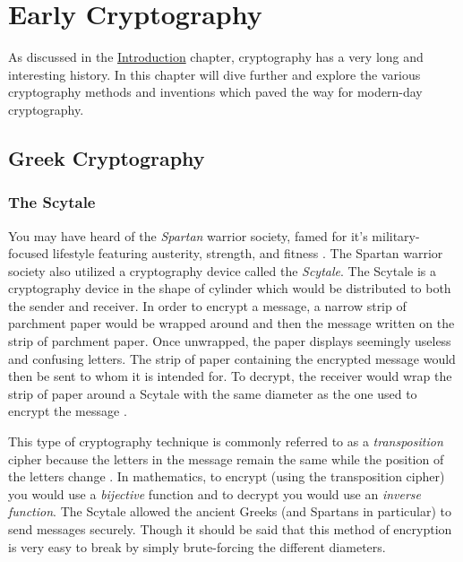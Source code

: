 \chapter{Early Cryptography} %
\label{Early Cryptography} %


As discussed in the \hyperref[Introduction]{Introduction} chapter, cryptography has a very long and interesting history. 
In this chapter will dive further and explore the various cryptography methods and inventions which paved the 
way for modern-day cryptography.

\section{Greek Cryptography}

\subsection{The Scytale}

You may have heard of the \textit{Spartan} warrior society, famed for it's military-focused lifestyle featuring austerity,
strength, and fitness \cite{wiki:spartan_army}. The Spartan warrior society also utilized a cryptography device called the
\textit{Scytale}. The Scytale is a cryptography device in the shape of cylinder which would be distributed to both the sender
and receiver. In order to encrypt a message, a narrow strip of parchment paper would be wrapped around and then the message
written on the strip of parchment paper. Once unwrapped, the paper displays seemingly useless and confusing letters. The 
strip of paper containing the encrypted message would then be sent to whom it is intended for. To decrypt, the receiver would
wrap the strip of paper around a Scytale with the same diameter as the one used to encrypt the message 
\cite{history_of_cryptography}.

This type of cryptography technique is commonly referred to as a \textit{transposition} cipher because the letters
in the message remain the same while the position of the letters change \cite{wiki:scytale}. In mathematics, to encrypt
(using the transposition cipher) you would use a \textit{bijective} function and to decrypt you would use an 
\textit{inverse function}. The Scytale allowed the ancient Greeks (and Spartans in particular) to send messages 
securely. Though it should be said that this method of encryption is very easy to break by simply brute-forcing the different 
diameters.

